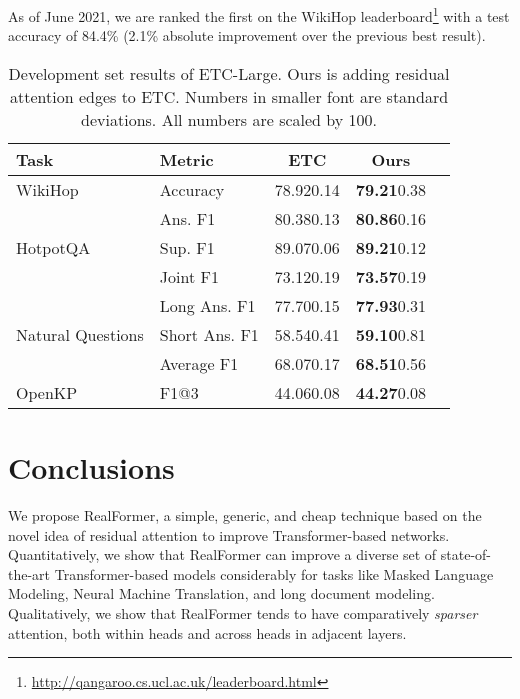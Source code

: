 \documentclass[11pt,a4paper]{article}
\begin{document}
As of June 2021, we are ranked the first on the WikiHop leaderboard\footnote{\url{http://qangaroo.cs.ucl.ac.uk/leaderboard.html}}
with a test accuracy of 84.4\% (2.1\% absolute improvement over the previous best result).


\begin{table}
\setlength{\tabcolsep}{3.5pt}
\centering
\begin{tabular}{l|l||ccc} \hline
\textbf{Task}              & \textbf{Metric}    & \textbf{ETC}           &\textbf{Ours} \\ \hline
WikiHop                    & Accuracy           &78.92\tiny{0.14}   &\textbf{79.21}\tiny{0.38}   \\ \hline

\multirow{3}{*}{HotpotQA}  & Ans. F1            &80.38\tiny{0.13}  &\textbf{80.86}\tiny{0.16}   \\
                           & Sup. F1            &89.07\tiny{0.06}  &\textbf{89.21}\tiny{0.12}   \\
                           & Joint F1           &73.12\tiny{0.19}  &\textbf{73.57}\tiny{0.19}   \\ \hline

\multirow{3}{1.5cm}{Natural Questions}        & Long Ans. F1       &77.70\tiny{0.15}   &\textbf{77.93}\tiny{0.31}   \\
                           & Short Ans. F1      &58.54\tiny{0.41}   &\textbf{59.10}\tiny{0.81}   \\
                           & Average F1         &68.07\tiny{0.17}   &\textbf{68.51}\tiny{0.56}   \\ \hline

OpenKP                     & F1@3               &44.06\tiny{0.08}   &\textbf{44.27}\tiny{0.08}   \\ \hline
\end{tabular}
\caption{Development set results of ETC-Large. Ours is adding residual attention edges to ETC. Numbers in smaller font are standard deviations. All numbers are scaled by 100.}
\label{table:etc}
\end{table}






\section{Conclusions}
We propose RealFormer, a simple, generic, and cheap technique based on the novel idea of residual attention to improve Transformer-based networks.
Quantitatively, we show that RealFormer can improve a diverse set of state-of-the-art Transformer-based models considerably for tasks like Masked Language Modeling, Neural Machine Translation, and long document modeling.
Qualitatively, we show that RealFormer tends to have comparatively \emph{sparser} attention, both within heads and across heads in adjacent layers.
\end{document}
